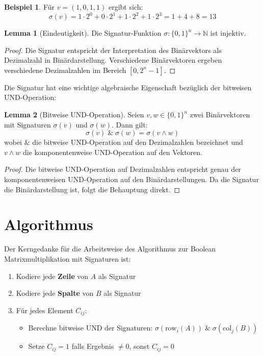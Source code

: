 ﻿\documentclass[a4paper,12pt]{article}
\theoremstyle{definition}
\newtheorem{beispiel}{Beispiel}
\newtheorem{lemma}{Lemma}
\begin{document}
\begin{beispiel}
	Für $v = (1, 0, 1, 1)$ ergibt sich:
	\[
	\sigma(v) = 1 \cdot 2^0 + 0 \cdot 2^1 + 1 \cdot 2^2 + 1 \cdot 2^3 = 1 + 4 + 8 = 13
	\]
\end{beispiel}

\begin{lemma}[Eindeutigkeit]
	Die Signatur-Funktion $\sigma: \{0,1\}^n \to \mathbb{N}$ ist injektiv.
\end{lemma}

\begin{proof}
	Die Signatur entspricht der Interpretation des Binärvektors als Dezimalzahl in Binärdarstellung. Verschiedene Binärvektoren ergeben verschiedene Dezimalzahlen im Bereich $[0, 2^n-1]$.
\end{proof}

Die Signatur hat eine wichtige algebraische Eigenschaft bezüglich der bitweisen UND-Operation:

\begin{lemma}[Bitweise UND-Operation]
	Seien $v, w \in \{0,1\}^n$ zwei Binärvektoren mit Signaturen $\sigma(v)$ und $\sigma(w)$. Dann gilt:
	\[
	\sigma(v) \; \& \; \sigma(w) = \sigma(v \wedge w)
	\]
	wobei $\&$ die bitweise UND-Operation auf den Dezimalzahlen bezeichnet und $v \wedge w$ die komponentenweise UND-Operation auf den Vektoren.
\end{lemma}

\begin{proof}
	Die bitweise UND-Operation auf Dezimalzahlen entspricht genau der komponentenweisen UND-Operation auf den Binärdarstellungen. Da die Signatur die Binärdar\-stellung ist, folgt die Behauptung direkt.
\end{proof}

\section{Algorithmus}
Der Kerngedanke für die Arbeitsweise des Algorithmus zur Boolean Matrixmultiplikation mit Signaturen ist:

\begin{enumerate}
	\item Kodiere jede \textbf{Zeile} von $A$ als Signatur
	\item Kodiere jede \textbf{Spalte} von $B$ als Signatur
	\item Für jedes Element $C_{ij}$:
	\begin{itemize}
		\item[-] Berechne bitweise UND der Signaturen: $\sigma(\text{row}_i(A)) \; \& \; \sigma(\text{col}_j(B))$
		\item[-] Setze $C_{ij} = 1$ falls Ergebnis $\neq 0$, sonst $C_{ij} = 0$
	\end{itemize}
\end{enumerate}
\end{document}
